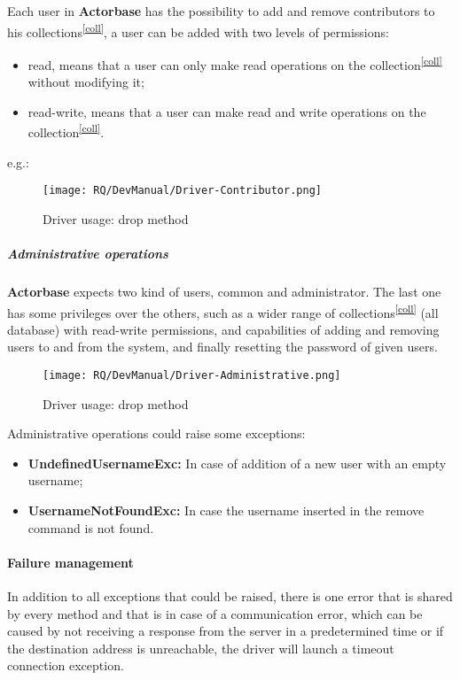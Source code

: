 \documentclass{scalatekids-article}
\begin{document}
Each user in \textbf{Actorbase} has the possibility to add and remove contributors
to his collections\textsuperscript{\ref{coll}}, a user can be added with two levels of
permissions:
\begin{itemize}
\item read, means that a user can only make read operations on the collection\textsuperscript{\ref{coll}} without modifying it;
\item read-write, means that a user can make read and write operations on the collection\textsuperscript{\ref{coll}}.
\end{itemize}
e.g.:
\begin{figure}[H]
  \begin{center}
    \texttt{[image: RQ/DevManual/Driver-Contributor.png]}
    \caption{Driver usage: drop method}
  \end{center}
\end{figure}

\subparagraph{Administrative operations}

\textbf{Actorbase} expects two kind of users, common and administrator. The last one has
some privileges over the others, such as a wider range of collections\textsuperscript{\ref{coll}} (all
database) with read-write permissions, and capabilities of adding and removing
users to and from the system, and finally resetting the password of given users.
\begin{figure}[H]
  \begin{center}
    \texttt{[image: RQ/DevManual/Driver-Administrative.png]}
    \caption{Driver usage: drop method}
  \end{center}
\end{figure}
Administrative operations could raise some exceptions:
\begin{itemize}
\item \textbf{UndefinedUsernameExc:} In case of addition of a new user with an empty username;
\item \textbf{UsernameNotFoundExc:} In case the username inserted in the remove command is not found.
\end{itemize}

\paragraph{Failure management}

In addition to all exceptions that could be raised, there is one error that is
shared by every method and that is in case of a communication error, which can
be caused by not receiving a response from the server in a predetermined time or
if the destination address is unreachable, the driver will launch a
timeout connection exception.
\end{document}
